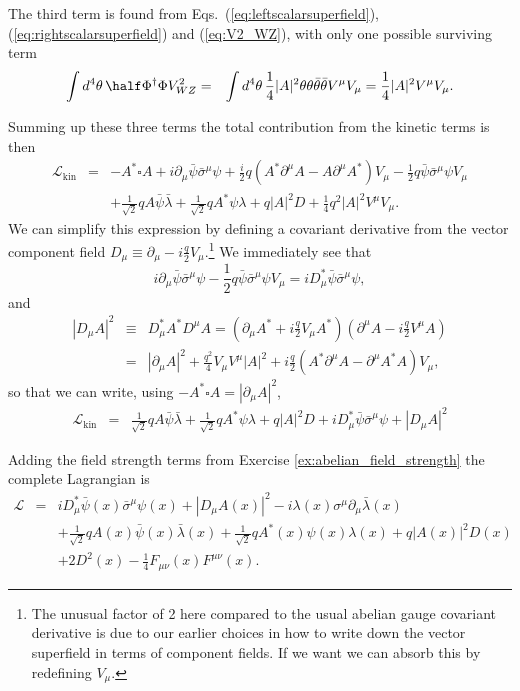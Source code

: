 \documentclass[notes.tex]{subfiles}
\begin{document}
\begin{Answer}
The third term is found from Eqs.~(\ref{eq:leftscalarsuperfield}), (\ref{eq:rightscalarsuperfield}) and (\ref{eq:V2_WZ}), with only one possible surviving term
\begin{eqnarray}
\int d^4\theta \, \half\Phi^\dagger \Phi V^2_{WZ} &=&\int d^4\theta \,  \frac{1}{4} |A|^2 \theta\theta\bar{\theta}\bar{\theta}V^\mu V_\mu = \frac{1}{4} |A|^2V^\mu V_\mu.
\end{eqnarray}

Summing up these three terms the total contribution from the kinetic terms is then
\begin{eqnarray}
\mathcal L_\text{kin} &=& -A^*\square A+i\partial_\mu\bar\psi\bar\sigma^\mu\psi +\frac{i}{2} q( A^*\partial^\mu A- A\partial^\mu A^* )V_\mu -\frac{1}{2}q\bar\psi\bar\sigma^\mu\psi V_\mu \nonumber \\
&& + \frac{1}{\sqrt{2}}qA\bar\psi\bar\lambda + \frac{1}{\sqrt{2}} qA^*\psi \lambda +q|A|^2D + \frac{1}{4}q^2 |A|^2V^\mu V_\mu.
\end{eqnarray}
We can simplify this expression by defining a covariant derivative from the vector component field $D_\mu\equiv \partial_\mu-i\frac{q}{2}V_\mu$.\footnote{The unusual factor of 2 here compared to the usual abelian gauge covariant derivative is due to our earlier choices in how to write down the vector superfield in terms of component fields. If we want we can absorb this by redefining $V_\mu$.}
We immediately see that 
\begin{equation}
i\partial_\mu\bar\psi\bar\sigma^\mu\psi-\frac{1}{2}q\bar\psi\bar\sigma^\mu\psi V_\mu =iD_\mu^*\bar\psi\bar\sigma^\mu\psi,
\end{equation}
and
\begin{eqnarray}
|D_\mu A|^2 &\equiv& D^*_\mu A^*D^\mu A= (\partial_\mu A^*+i\frac{q}{2}V_\mu A^*)(\partial^\mu A-i\frac{q}{2}V^\mu A) \nonumber\\
&=& |\partial_\mu A|^2+\frac{q^2}{4}V_\mu V^\mu |A|^2 +i\frac{q}{2}(A^*\partial^\mu A-\partial^\mu A^* A )V_\mu,
\end{eqnarray}
so that we can write, using $-A^*\square A= |\partial_\mu A|^2$,
\begin{eqnarray}
\mathcal L_\text{kin} &=& \frac{1}{\sqrt{2}}qA\bar\psi\bar\lambda + \frac{1}{\sqrt{2}} qA^*\psi \lambda +q|A|^2D 
+iD_\mu^*\bar\psi\bar\sigma^\mu\psi+|D_\mu A|^2 \nonumber
\end{eqnarray}

Adding the  field strength terms from Exercise \ref{ex:abelian_field_strength} the complete Lagrangian is
\begin{eqnarray}
\mathcal L &=& iD_\mu^*\bar\psi(x)\bar\sigma^\mu\psi(x)+|D_\mu A(x)|^2 -i\lambda(x)\sigma^\mu \partial_\mu \bar\lambda(x) \nonumber\\
&& + \frac{1}{\sqrt{2}}qA(x)\bar\psi(x)\bar\lambda(x) + \frac{1}{\sqrt{2}} qA^*(x)\psi(x) \lambda(x) +q|A(x)|^2D(x) 
\nonumber\\
&&+2D^2(x)-\frac{1}{4}F_{\mu\nu}(x)F^{\mu\nu}(x) .
\end{eqnarray}
\end{Answer}
\end{document}
